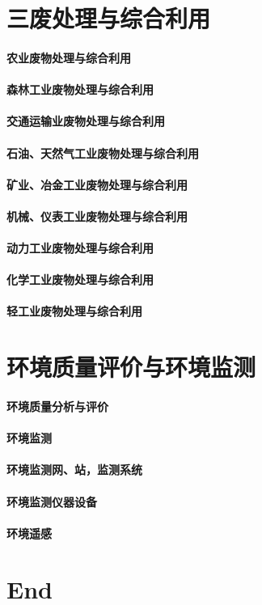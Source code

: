 \documentclass[UTF8]{../ApplicationUniverse}
\begin{document}
\chapter{三废处理与综合利用}
\subsubsection{农业废物处理与综合利用}
\subsubsection{森林工业废物处理与综合利用}
\subsubsection{交通运输业废物处理与综合利用}
\subsubsection{石油、天然气工业废物处理与综合利用}
\subsubsection{矿业、冶金工业废物处理与综合利用}
\subsubsection{机械、仪表工业废物处理与综合利用}
\subsubsection{动力工业废物处理与综合利用}
\subsubsection{化学工业废物处理与综合利用}
\subsubsection{轻工业废物处理与综合利用}





\chapter{环境质量评价与环境监测}
\subsubsection{环境质量分析与评价}
\subsubsection{环境监测}
\subsubsection{环境监测网、站，监测系统}
\subsubsection{环境监测仪器设备}
\subsubsection{环境遥感}




\chapter{End}
\end{document}
